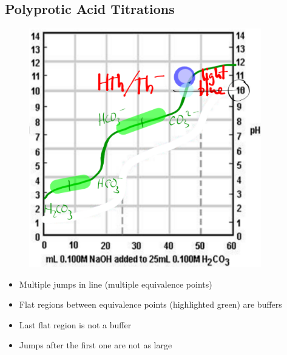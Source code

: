 \documentclass[a4paper,12pt]{article}
\begin{document}
\subsection{Polyprotic Acid Titrations}
\begin{figure}[H]
    \centering
    \includegraphics[width=0.9\textwidth]{polyprotic}
\end{figure}
\begin{itemize}
    \item{Multiple jumps in line (multiple equivalence points)}
    \item{Flat regions between equivalence points (highlighted green) are buffers}
    \item{Last flat region is not a buffer}
    \item{Jumps after the first one are not as large}
\end{itemize}
\end{document}
